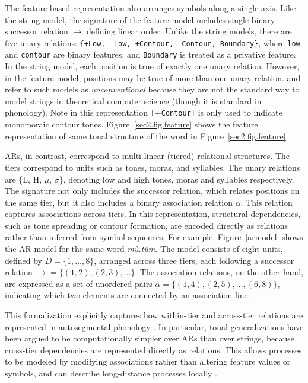 % 

The feature-based representation also arranges symbols along a single axis.
Like the string model, the signature of the feature model
includes single binary successor relation $\rightarrow$ defining linear order.
Unlike the string models, there are five unary relations:
\texttt{\{+Low, -Low, +Contour, -Contour, Boundary\}},
where \texttt{low} and \texttt{contour} are binary features, 
and \texttt{Boundary} is treated as a privative feature.
In the string model, each position is true of exactly one unary relation.
However, in the feature model, positions may be true of more than one unary
relation.
\citet{strother2017using} and \citet{vu2018statistical} refer to such models as
\textit{unconventional} because they are not the standard way to model strings in
theoretical computer science (though it is standard in phonology).
Note in this representation \texttt{[$\pm$Contour]} is only used to indicate monomoraic
contour tones.
Figure~\ref{sec2.fig.feature} shows the feature representation of same tonal structure of the word in Figure~\ref{sec2.fig.feature}
% 

ARs, in contrast, correspond to multi-linear (tiered) relational structures.
The tiers correspond to units such as tones, moras, and syllables.
The unary relations are \{L, H, \(\mu\), \(\sigma\)\},
denoting low and high tones, moras and syllables respectively.
The signature not only includes the successor relation,
which relates positions on the same tier,
but it also includes a binary  association relation $\alpha$.
This relation captures associations across tiers.
In this representation, structural dependencies,
such as tone spreading or contour formation,
are encoded directly as relations rather than inferred from symbol sequences.
For example, Figure~\ref{armodel} shows the AR model for the same word \textit{mù.tûm}. The model consists of eight units,
defined by $D=\{1,\ldots,8\}$, arranged across three tiers, each following
a successor relation $\rightarrow=\{(1,2),(2,3),\ldots\}$. The association
relations, on the other hand, are expressed as a set of unordered pairs
$\alpha=\{(1,4),(2,5),\ldots,(6,8)\}$, indicating which two elements are
connected by an association line.

% 

This formalization explicitly captures how within-tier and across-tier
relations are represented in autosegmental phonology
\citep{goldsmith1976autosegmental}. In particular, tonal generalizations
have been argued to be computationally simpler over ARs than over strings,
because cross-tier dependencies are represented directly as relations. This
allows processes to be modeled by modifying associations rather than
altering feature values or symbols, and can describe long-distance
processes locally \citep{goldsmith1976autosegmental,jardine2017LocalNature}.

